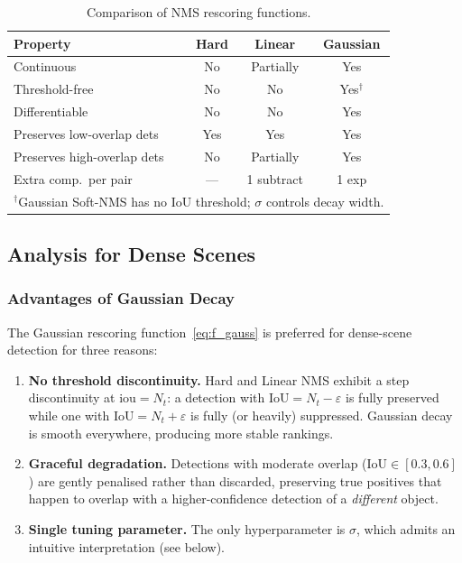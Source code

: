 \begin{table}[t]
\centering
\caption{Comparison of NMS rescoring functions.}
\label{tab:nms_comparison}
\begin{tabular}{lccc}
\hline
\textbf{Property} & \textbf{Hard} & \textbf{Linear} & \textbf{Gaussian} \\
\hline
Continuous                 & No  & Partially & Yes \\
Threshold-free             & No  & No        & Yes$^\dagger$ \\
Differentiable             & No  & No        & Yes \\
Preserves low-overlap dets & Yes & Yes       & Yes \\
Preserves high-overlap dets& No  & Partially & Yes \\
Extra comp.\ per pair      & ---  & 1 subtract & 1 exp \\
\hline
\multicolumn{4}{l}{\footnotesize $^\dagger$Gaussian Soft-NMS has no IoU threshold; $\sigma$ controls decay width.}
\end{tabular}
\end{table}

\subsection{Analysis for Dense Scenes}
\label{ssec:dense_analysis}

\subsubsection{Advantages of Gaussian Decay}

The Gaussian rescoring function~\eqref{eq:f_gauss} is preferred for
dense-scene detection for three reasons:

\begin{enumerate}
  \item \textbf{No threshold discontinuity.}
    Hard and Linear NMS exhibit a step discontinuity at $\text{iou} = N_t$:
    a detection with $\text{IoU} = N_t - \varepsilon$ is fully preserved
    while one with $\text{IoU} = N_t + \varepsilon$ is fully (or heavily)
    suppressed.  Gaussian decay is smooth everywhere, producing more
    stable rankings.

  \item \textbf{Graceful degradation.}
    Detections with moderate overlap ($\text{IoU} \in [0.3, 0.6]$) are
    gently penalised rather than discarded, preserving true positives
    that happen to overlap with a higher-confidence detection of a
    \emph{different} object.

  \item \textbf{Single tuning parameter.}
    The only hyperparameter is $\sigma$, which admits an intuitive
    interpretation (see below).
\end{enumerate}

